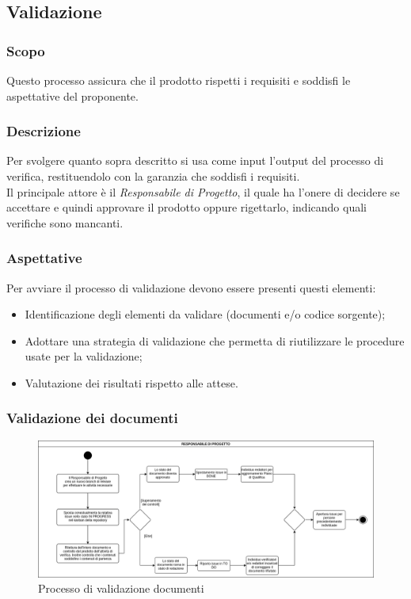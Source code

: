 \subsection{Validazione}
\subsubsection{Scopo}
Questo processo assicura che il prodotto rispetti i requisiti e soddisfi le aspettative del proponente.

\subsubsection{Descrizione}
Per svolgere quanto sopra descritto si  usa come input l'output del processo di verifica,
restituendolo con la garanzia che soddisfi i requisiti.\\
Il principale attore è il \textit{Responsabile di Progetto}, il quale ha l'onere di decidere
se accettare e quindi approvare il prodotto oppure rigettarlo, indicando quali verifiche sono mancanti.

\subsubsection{Aspettative}
Per avviare il processo di validazione devono essere presenti questi elementi:
\begin{itemize}
    \item Identificazione degli elementi da validare (documenti e/o codice sorgente);
    \item Adottare una strategia di validazione che permetta di riutilizzare le procedure usate
          per la validazione;
    \item Valutazione dei risultati rispetto alle attese.
\end{itemize}

\subsubsection{Validazione dei documenti}
\begin{figure}[h!]
    \includegraphics[width=\linewidth]{res/images/processo_validazione.png}
    \caption{Processo di validazione documenti}
\end{figure}

